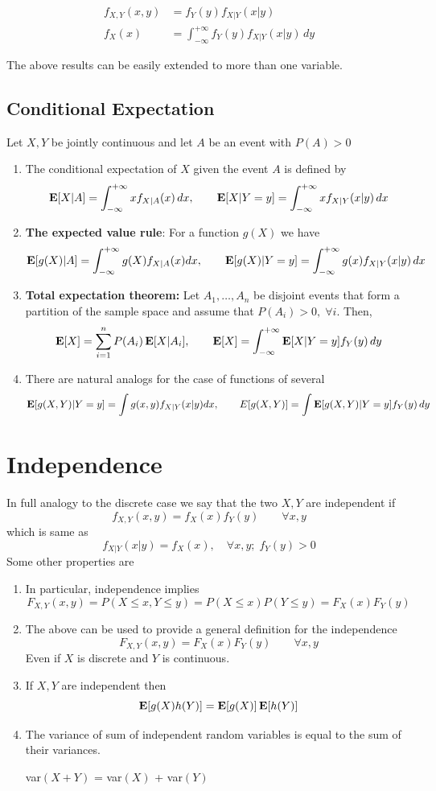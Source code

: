 \begin{align*}
    f_{X,Y}(x,y) &= f_Y(y)f_{X|Y}(x|y) \\
    f_X(x) &= \int_{-\infty}^{+\infty}f_Y(y)f_{X|Y}(x|y) \, dy
\end{align*}

The above results can be easily extended to more than one variable.

\subsection{Conditional Expectation}
Let $X, Y$ be jointly continuous \rv and let $A$ be an event with $P(A)>0$
\begin{enumerate}
    \item The conditional expectation of $X$ given the event $A$ is defined by 
    \[\operatorname{\textbf{E}}[X|A]=\int_{-\infty}^{+\infty}xf_{X|A}(x) \, dx, \qquad
    \operatorname{\textbf{E}}[X|Y=y] = \int_{-\infty}^{+\infty}xf_{X|Y}(x|y) \, dx\] 
    \item \textbf{The expected value rule}: For a function $g(X)$ we have
    \[\operatorname{\textbf{E}}[g(X)|A] = \int_{-\infty}^{+\infty} g(X) f_{X|A}(x)dx, \qquad 
    \operatorname{\textbf{E}}[g(X)|Y=y] = \int_{-\infty}^{+\infty}g(x)f_{X|Y}(x|y) \, dx\]
    \item \textbf{Total expectation theorem:} Let $A_1,\ldots,A_n$ be disjoint events that form a partition of the sample space and assume that $P(A_i)>0, \; \forall i$. Then,
    \[\operatorname{\textbf{E}}[X] = \sum_{i=1}^{n} P(A_i) \operatorname{\textbf{E}}[X|A_i], \qquad \operatorname{\textbf{E}}[X] = \int_{-\infty}^{+\infty}\operatorname{\textbf{E}}[X|Y=y] f_Y(y) \, dy\]
    \item There are natural analogs for the case of functions of several \rv 
    \[\operatorname{\textbf{E}}[g(X,Y)|Y=y] = \int g(x,y)f_{X|Y}(x|y) dx, \qquad E[g(X,Y)] = \int \operatorname{\textbf{E}}[g(X,Y)|Y=y] f_Y(y) \, dy\]
\end{enumerate}

\section{Independence}
In full analogy to the discrete case we say that the two \rv $X, Y$ are independent if
\[\boxed {f_{X,Y}(x,y) = f_X(x)f_Y(y) \qquad \forall x,y}\]
which is same as
\[f_{X|Y}(x|y) = f_X(x), \quad \forall x,y; \; f_Y(y)>0\]
Some other properties are
\begin{enumerate}
    \item In particular, independence implies
    \[F_{X,Y}(x,y)=P(X\le x, Y\le y)=P(X\le x)P(Y\le y)=F_X(x)F_Y(y)\]
    \item The above can be used to provide a general definition for the independence
    \[F_{X,Y}(x,y) = F_X(x)F_Y(y) \qquad \forall x,y\]
    Even if $X$ is discrete and $Y$ is continuous.
    \item If $X, Y$ are independent then
    \[\operatorname{\textbf{E}}[g(X)h(Y)] = \operatorname{\textbf{E}}[g(X)]\operatorname{\textbf{E}}[h(Y)]\]
    \item The variance of sum of independent random variables is equal to the sum of their variances.
    \begin{center}
        var$(X+Y)$ = var$(X)$ + var$(Y)$
    \end{center}
\end{enumerate}

